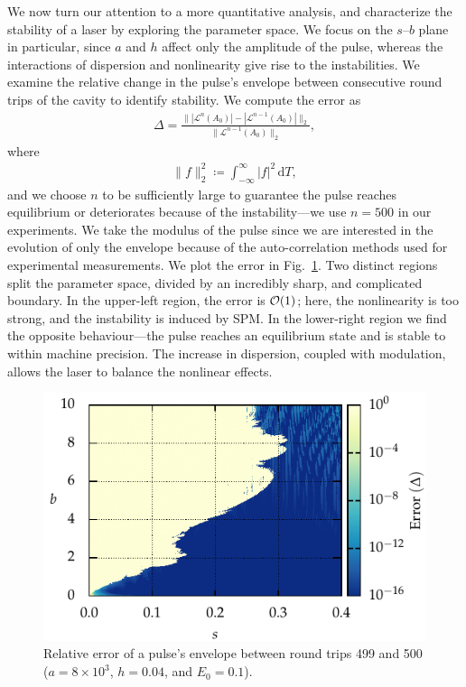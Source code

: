 \documentclass[9pt,twocolumn,twoside]{osajnl}
\let\originalleft\left
\let\originalright\right
\renewcommand{\left}{\mathopen{}\mathclose\bgroup\originalleft}
\renewcommand{\right}{\aftergroup\egroup\originalright}
\providecommand{\df}{\textrm{d}} %
\providecommand{\bigO}[1]{\ensuremath{\mathop{}\mathopen{}\mathcal{O}\mathopen{}\left(#1\right)}} %
\begin{document}
We now turn our attention to a more quantitative analysis, and characterize the stability of a laser by exploring the parameter space. We focus on the $s$--$b$ plane in particular, since $a$ and $h$ affect only the amplitude of the pulse, whereas the interactions of dispersion and nonlinearity give rise to the instabilities. We examine the relative change in the pulse's envelope between consecutive round trips of the cavity to identify stability. We compute the error as
\begin{align}
	\Delta = \frac{\| |\mathcal{L}^n(A_0)| - |\mathcal{L}^{n-1}(A_0)| \|_2}{\| \mathcal{L}^{n-1}(A_0) \|_2},
	\label{eq:error}
\end{align}
where
\begin{align}
	\| f \|_2^2 \coloneqq \int_{-\infty}^\infty |f|^2 \, \df T,
\end{align}
and we choose $n$ to be sufficiently large to guarantee the pulse reaches equilibrium or deteriorates because of the instability---we use $n = 500$ in our experiments. We take the modulus of the pulse since we are interested in the evolution of only the envelope because of the auto-correlation methods used for experimental measurements. We plot the error in Fig.~\ref{fig:error}. Two distinct regions split the parameter space, divided by an incredibly sharp, and complicated boundary. In the upper-left region, the error is $\bigO{1}$; here, the nonlinearity is too strong, and the instability is induced by SPM. In the lower-right region we find the opposite behaviour---the pulse reaches an equilibrium state and is stable to within machine precision. The increase in dispersion, coupled with modulation, allows the laser to balance the nonlinear effects. 

\begin{figure}[tbp]
	\centering
	\includegraphics{Figures/ParamSpaceErr}
	\caption{Relative error of a pulse's envelope between round trips 499 and 500 ($a = 8 \times 10^3$, $h = 0.04$, and $E_0 = 0.1$).}
	\label{fig:error}
\end{figure}
\end{document}
